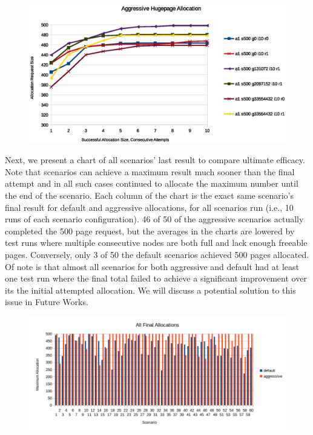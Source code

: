 \documentclass{article}
\begin{document}
\begin{figure}[H]
	\includegraphics[width=\linewidth]{./datums/aggressive_alloc.eps}
	\label{fig:aggressive_alloc}
\end{figure}

Next, we present a chart of all scenarios' last result to compare ultimate efficacy. Note that scenarios can achieve a maximum result much sooner than the final attempt and in all such cases continued to allocate the maximum number until the end of the scenario. Each column of the chart is the exact same scenario's final result for default and aggressive allocations, for all scenarios run (i.e., 10 runs of each scenario configuration). 46 of 50 of the aggressive scenarios actually completed the 500 page request, but the averages in the charts are lowered by test runs where multiple consecutive nodes are both full and lack enough freeable pages. Conversely, only 3 of 50 the default scenarios achieved 500 pages allocated. Of note is that almost all scenarios for both aggressive and default had at least one test run where the final total failed to achieve a significant improvement over its the initial attempted allocation. We will discuss a potential solution to this issue in Future Works.

\begin{figure}[H]
	\includegraphics[width=\linewidth]{./datums/final_allocs.png}
	\label{fig:final_allocs}
\end{figure}
\end{document}
